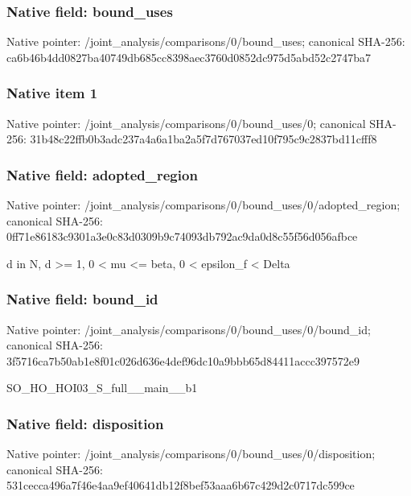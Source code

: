 \documentclass[10pt,a4paper]{article}
\begin{document}
\subsubsection{Native field: bound\_\allowbreak{}uses}
Native pointer: /joint\_\allowbreak{}analysis/comparisons/0/bound\_\allowbreak{}uses; canonical SHA-256: ca6b46b4dd0827ba40749db685cc8398aec3760d0852dc975d5abd52c2747ba7

\subsubsection{Native item 1}
Native pointer: /joint\_\allowbreak{}analysis/comparisons/0/bound\_\allowbreak{}uses/0; canonical SHA-256: 31b48c22ffb0b3adc237a4a6a1ba2a5f7d767037ed10f795c9c2837bd11cfff8

\subsubsection{Native field: adopted\_\allowbreak{}region}
Native pointer: /joint\_\allowbreak{}analysis/comparisons/0/bound\_\allowbreak{}uses/0/adopted\_\allowbreak{}region; canonical SHA-256: 0ff71e86183c9301a3e0c83d0309b9c74093db792ac9da0d8c55f56d056afbce

\begingroup\raggedright\sloppy d in N,\allowbreak{} d >=\allowbreak{} 1,\allowbreak{} 0 < mu <=\allowbreak{} beta,\allowbreak{} 0 < epsilon\_\allowbreak{}f < Delta\par\endgroup

\subsubsection{Native field: bound\_\allowbreak{}id}
Native pointer: /joint\_\allowbreak{}analysis/comparisons/0/bound\_\allowbreak{}uses/0/bound\_\allowbreak{}id; canonical SHA-256: 3f5716ca7b50ab1e8f01c026d636e4def96dc10a9bbb65d84411accc397572e9

\begingroup\raggedright\sloppy SO\_\allowbreak{}HO\_\allowbreak{}HOI03\_\allowbreak{}S\_\allowbreak{}full\_\allowbreak{}\_\allowbreak{}main\_\allowbreak{}\_\allowbreak{}b1\par\endgroup

\subsubsection{Native field: disposition}
Native pointer: /joint\_\allowbreak{}analysis/comparisons/0/bound\_\allowbreak{}uses/0/disposition; canonical SHA-256: 531cecca496a7f46e4aa9ef40641db12f8bef53aaa6b67c429d2c0717dc599ce
\end{document}
